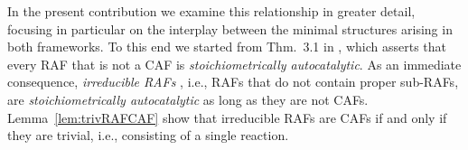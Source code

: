 \documentclass[pdflatex]{sn-jnl}
\theoremstyle{thmstyleone}%
\theoremstyle{examplesty}%
\theoremstyle{thmstylethree}%
\newcommand{\king}{K}
\newcommand{\queen}{\mathbf{Q}}
\newcommand{\PFS}[1]{\begingroup\color{cyan}#1\endgroup}
\begin{document}


In the present contribution we examine this relationship in greater
detail, focusing in particular on the interplay between the minimal
structures arising in both frameworks.  \PFS{To this end we started from
  Thm.~3.1 in \cite{golnik_bridging_2026}, which asserts that every
  \textsc{RAF} that is not a \textsc{CAF} is \emph{stoichiometrically
  autocatalytic}. As an immediate consequence, \emph{irreducible RAFs}
  \cite{steel_minimal_2013}, i.e., \textsc{RAF}s that do not contain proper
  sub-RAFs, are \emph{stoichiometrically autocatalytic} as long as they are
  not CAFs.} Lemma~\ref{lem:trivRAFCAF} show that irreducible RAFs are CAFs
if and only if they are trivial, i.e., consisting of a single reaction.
\end{document}

